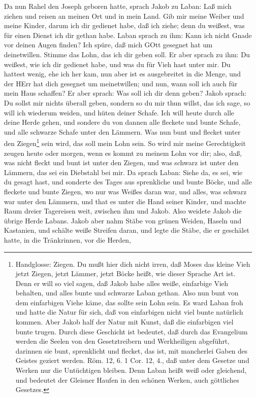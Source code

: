 Da nun Rahel den Joseph geboren hatte, sprach Jakob zu Laban: Laß mich ziehen und reisen an meinen Ort und in mein Land. Gib mir meine Weiber und meine Kinder, darum ich dir gedienet habe, daß ich ziehe; denn du weißest, was für einen Dienst ich dir gethan habe. Laban sprach zu ihm: Kann ich nicht Gnade vor deinen Augen finden? Ich spüre, daß mich GOtt gesegnet hat um deinetwillen. Stimme das Lohn, das ich dir geben soll. Er aber sprach zu ihm: Du weißest, wie ich dir gedienet habe, und was du für Vieh hast unter mir. Du hattest wenig, ehe ich her kam, nun aber ist es ausgebreitet in die Menge, und der HErr hat dich gesegnet um meinetwillen; und nun, wann soll ich auch für mein Haus schaffen? Er aber sprach: Was soll ich dir denn geben? Jakob sprach: Du sollst mir nichts überall geben, sondern so du mir thun willst, das ich sage, so will ich wiederum weiden, und hüten deiner Schafe. Ich will heute durch alle deine Herde gehen, und sondere du von dannen alle fleckete und bunte Schafe, und alle schwarze Schafe unter den Lämmern. Was nun bunt und flecket unter den Ziegen\footnote{Handglosse: Ziegen. Du mußt hier dich nicht irren, daß Moses das kleine Vieh jetzt Ziegen, jetzt Lämmer, jetzt Böcke heißt, wie dieser Sprache Art ist. Denn er will so viel sagen, daß Jakob habe alles weiße, einfarbige Vieh behalten, und alles bunte und schwarze Laban gethan. Also nun bunt von dem einfarbigen Viehe käme, das sollte sein Lohn sein. Es ward Laban froh und hatte die Natur für sich, daß von einfarbigen nicht viel bunte natürlich kommen. Aber Jakob half der Natur mit Kunst, daß die einfarbigen viel bunte trugen. Durch diese Geschicht ist bedeutet, daß durch das Evangelium werden die Seelen von den Gesetztreibern und Werkheiligen abgeführt, darinnen sie bunt, sprenklicht und flecket, das ist, mit mancherlei Gaben des Geistes geziert werden. Röm. 12, 6. 1 Cor. 12, 4., daß unter dem Gesetze und Werken nur die Untüchtigen bleiben. Denn Laban heißt weiß oder gleichend, und bedeutet der Gleisner Haufen in den schönen Werken, auch göttliches Gesetzes.} sein wird, das soll mein Lohn sein. So wird mir meine Gerechtigkeit zeugen heute oder morgen, wenn es kommt zu meinem Lohn vor dir; also, daß, was nicht fleckt und bunt ist unter den Ziegen, und was schwarz ist unter den Lämmern, das sei ein Diebstahl bei mir. Da sprach Laban: Siehe da, es sei, wie du gesagt hast, und sonderte des Tages aus sprenkliche und bunte Böcke, und alle fleckete und bunte Ziegen, wo nur was Weißes daran war, und alles, was schwarz war unter den Lämmern, und that es unter die Hand seiner Kinder, und machte Raum dreier Tagereisen weit, zwischen ihm und Jakob. Also weidete Jakob die übrige Herde Labans. Jakob aber nahm Stäbe von grünen Weiden, Haseln und Kastanien, und schälte weiße Streifen daran, und legte die Stäbe, die er geschälet hatte, in die Tränkrinnen, vor die Herden,
